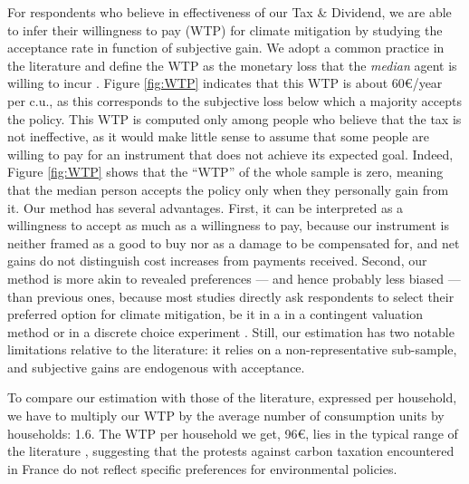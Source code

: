 \documentclass[12pt]{article} %
\begin{document}
\begin{appendices}
For respondents who believe in effectiveness of our Tax \& Dividend, we are able to infer their willingness to pay (WTP) for climate mitigation by studying the acceptance rate in function of subjective gain. We adopt a common practice in the literature and define the WTP as the monetary loss that the \textit{median} agent is willing to incur \citep{hanemann_welfare_1984}. Figure \ref{fig:WTP} indicates that this WTP is about 60\euro{}/year per c.u., as this corresponds to the subjective loss below which a majority accepts the policy. This WTP is computed only among people who believe that the tax is not ineffective, as it would make little sense to assume that some people are willing to pay for an instrument that does not achieve its expected goal. Indeed, Figure \ref{fig:WTP} shows that the ``WTP'' of the whole sample is zero, meaning that the median person accepts the policy only when they personally gain from it. Our method has several advantages. First, it can be interpreted as a willingness to accept as much as a willingness to pay, because our instrument is neither framed as a good to buy nor as a damage to be compensated for, and net gains do not distinguish cost increases from payments received. Second, our method is more akin to revealed preferences --- and hence probably less biased \citep{murphy_meta-analysis_2005} --- than previous ones, because most studies directly ask respondents to select their preferred option for climate mitigation, be it in a in a contingent valuation method \citep{berrens_information_2004,cameron_individual_2005,kotchen_willingness--pay_2013} or in a discrete choice experiment \citep{longo_internalization_2008,alberini_preferences_2018}. Still, our estimation has two notable limitations relative to the literature: it relies on a non-representative sub-sample, and subjective gains are endogenous with acceptance. 

To compare our estimation with those of the literature, expressed per household, we have to multiply our WTP by the average number of consumption units by households: 1.6. The WTP per household we get, 96\euro{}, lies in the typical range of the literature \citep{jenkins_political_2014,streimikiene_review_2019}, suggesting that the protests against carbon taxation encountered in France do not reflect specific preferences for environmental policies.


\end{appendices}
\end{document}
